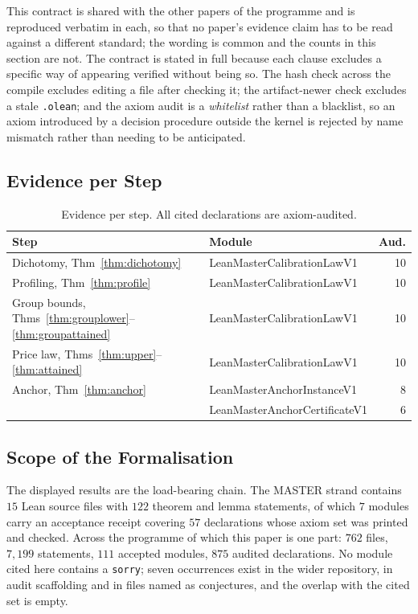 \documentclass[conference]{IEEEtran}
\theoremstyle{definition}
\newcommand{\lean}[1]{\textsf{\footnotesize #1}}
\begin{document}
This contract is shared with the other papers of the programme and is reproduced verbatim in
each, so that no paper's evidence claim has to be read against a different standard; the
wording is common and the counts in this section are not. The contract is stated in full
because each clause excludes a specific way of appearing verified without being so. The hash check across the compile excludes editing a file after
checking it; the artifact-newer check excludes a stale \texttt{.olean}; and the axiom audit is
a \emph{whitelist} rather than a blacklist, so an axiom introduced by a decision procedure
outside the kernel is rejected by name mismatch rather than needing to be anticipated.

\subsection{Evidence per Step}

\begin{table}[htbp]
\caption{Evidence per step. All cited declarations are axiom-audited.}
\label{tab:inventory}
\centering\footnotesize\setlength{\tabcolsep}{3pt}
\begin{tabular}{@{}llr@{}}
\toprule
Step & Module & Aud. \\
\midrule
Dichotomy, Thm~\ref{thm:dichotomy}   & \lean{LeanMasterCalibrationLawV1}    & 10 \\
Profiling, Thm~\ref{thm:profile}     & \lean{LeanMasterCalibrationLawV1}    & 10 \\
Group bounds, Thms~\ref{thm:grouplower}--\ref{thm:groupattained} & \lean{LeanMasterCalibrationLawV1} & 10 \\
Price law, Thms~\ref{thm:upper}--\ref{thm:attained} & \lean{LeanMasterCalibrationLawV1} & 10 \\
Anchor, Thm~\ref{thm:anchor}         & \lean{LeanMasterAnchorInstanceV1}    & 8 \\
                                     & \lean{LeanMasterAnchorCertificateV1} & 6 \\
\bottomrule
\end{tabular}
\end{table}

\subsection{Scope of the Formalisation}

The displayed results are the load-bearing chain. The MASTER strand contains $15$ Lean
source files with $122$ theorem and lemma statements, of which $7$ modules carry an acceptance
receipt covering $57$ declarations whose axiom set was printed and checked. Across the
programme of which this paper is one part: $762$ files, $7{,}199$ statements, $111$ accepted
modules, $875$ audited declarations. No module cited here contains a \texttt{sorry}; seven
occurrences exist in the wider repository, in audit scaffolding and in files named as
conjectures, and the overlap with the cited set is empty.
\end{document}
